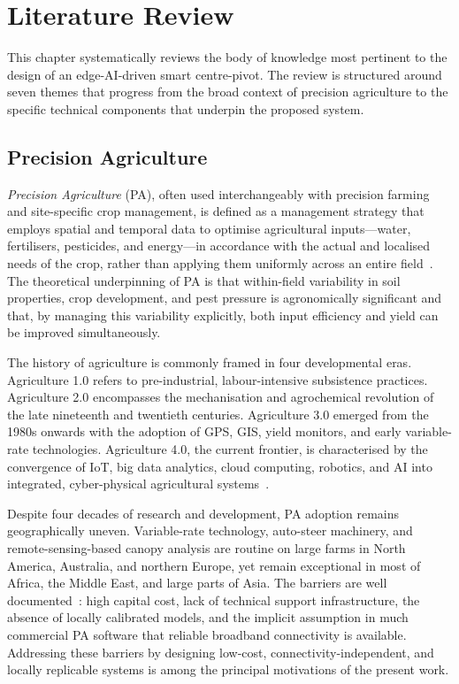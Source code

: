 \documentclass[12pt,a4paper]{report}
\newcommand{\abbr}[2]{\emph{#1} (#2)}
\begin{document}
\chapter{Literature Review}
\label{ch:litreview}
\pagestyle{fancy}
\thispagestyle{empty}

This chapter systematically reviews the body of knowledge most pertinent to the design of an edge-AI-driven smart centre-pivot. The review is structured around seven themes that progress from the broad context of precision agriculture to the specific technical components that underpin the proposed system.

\section{Precision Agriculture}

\abbr{Precision Agriculture}{PA}, often used interchangeably with precision farming and site-specific crop management, is defined as a management strategy that employs spatial and temporal data to optimise agricultural inputs---water, fertilisers, pesticides, and energy---in accordance with the actual and localised needs of the crop, rather than applying them uniformly across an entire field~\cite{Pierce1999}. The theoretical underpinning of PA is that within-field variability in soil properties, crop development, and pest pressure is agronomically significant and that, by managing this variability explicitly, both input efficiency and yield can be improved simultaneously.

The history of agriculture is commonly framed in four developmental eras. Agriculture 1.0 refers to pre-industrial, labour-intensive subsistence practices. Agriculture 2.0 encompasses the mechanisation and agrochemical revolution of the late nineteenth and twentieth centuries. Agriculture 3.0 emerged from the 1980s onwards with the adoption of GPS, GIS, yield monitors, and early variable-rate technologies. Agriculture 4.0, the current frontier, is characterised by the convergence of IoT, big data analytics, cloud computing, robotics, and AI into integrated, cyber-physical agricultural systems~\cite{Liu2020}.

Despite four decades of research and development, PA adoption remains geographically uneven. Variable-rate technology, auto-steer machinery, and remote-sensing-based canopy analysis are routine on large farms in North America, Australia, and northern Europe, yet remain exceptional in most of Africa, the Middle East, and large parts of Asia. The barriers are well documented~\cite{Kamilaris2018}: high capital cost, lack of technical support infrastructure, the absence of locally calibrated models, and the implicit assumption in much commercial PA software that reliable broadband connectivity is available. Addressing these barriers by designing low-cost, connectivity-independent, and locally replicable systems is among the principal motivations of the present work.
\end{document}
